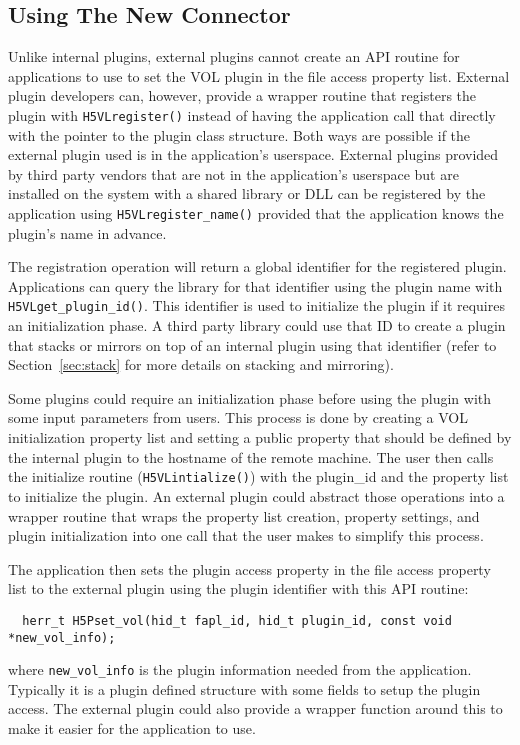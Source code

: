 \subsection{Using The New Connector}
Unlike internal plugins, external plugins cannot create an API routine for applications to use to set the VOL plugin in the file access property list. External plugin developers can, however, provide a wrapper routine that registers the plugin with {\tt H5VLregister()} instead of having the application call that directly with the pointer to the plugin class structure. Both ways are possible if the external plugin used is in the application's userspace. External plugins provided by third party vendors that are not in the application's userspace but are installed on the system with a shared library or DLL can be registered by the application using {\tt H5VLregister\_name()} provided that the application knows the plugin's name in advance.

The registration operation will return a global identifier for the registered plugin. Applications can query the library for that identifier using the plugin name with {\tt H5VLget\_plugin\_id()}. This identifier is used to initialize the plugin if it requires an initialization phase. A third party library could use that ID to create a plugin that stacks or mirrors on top of an internal plugin using that identifier (refer to Section~\ref{sec:stack} for more details on stacking and mirroring).

Some plugins could require an initialization phase before using the plugin with some input parameters from users. This process is done by creating a VOL initialization property list and setting a public property that should be defined by the internal plugin to the hostname of the remote machine. The user then calls the initialize routine ({\tt H5VLintialize()}) with the plugin\_id and the property list to initialize the plugin. An external plugin could abstract those operations into a wrapper routine that wraps the property list creation, property settings, and plugin initialization into one call that the user makes to simplify this process.

The application then sets the plugin access property in the file access property list to the external plugin using the plugin identifier with this API routine:
\begin{lstlisting}
  herr_t H5Pset_vol(hid_t fapl_id, hid_t plugin_id, const void *new_vol_info);
\end{lstlisting}
where {\tt new\_vol\_info} is the plugin information needed from the application. Typically it is a plugin defined structure with some fields to setup the plugin access. The external plugin could also provide a wrapper function around this to make it easier for the application to use. 

